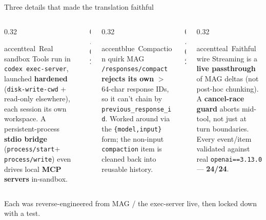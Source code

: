 \begin{frame}{Three details that made the translation faithful}
  \begin{columns}[t, totalwidth=\textwidth]
    \begin{column}{0.32\textwidth}
      \begin{featbox}{accentteal}{\ Real sandbox}
        \scriptsize
        Tools run in \texttt{codex exec-server}, launched \textbf{hardened}
        (\texttt{disk-write-cwd} + read-only elsewhere), each session its own
        workspace. A persistent-process \textbf{stdio bridge}
        (\texttt{process/start}$+$\texttt{process/write}) even drives local
        \textbf{MCP servers} in-sandbox.
      \end{featbox}
    \end{column}
    \begin{column}{0.02\textwidth}\end{column}
    \begin{column}{0.32\textwidth}
      \begin{featbox}{accentblue}{\ Compaction quirk}
        \scriptsize
        MAG \texttt{/responses/compact} \textbf{rejects its own} $>$64-char
        response IDs, so it can't chain by \texttt{previous\_response\_id}.
        Worked around via the \texttt{\{model,input\}} form; the non-input
        \texttt{compaction} item is cleaned back into reusable history.
      \end{featbox}
    \end{column}
    \begin{column}{0.02\textwidth}\end{column}
    \begin{column}{0.32\textwidth}
      \begin{featbox}{accentteal}{\ Faithful wire}
        \scriptsize
        Streaming is a \textbf{live passthrough} of MAG deltas (not post-hoc
        chunking). A \textbf{cancel-race guard} aborts mid-tool, not just at
        turn boundaries. Every event/item validated against real
        \texttt{openai==3.13.0} --- \textbf{24/24}.
      \end{featbox}
    \end{column}
  \end{columns}
  \vspace{8pt}
  \begin{center}
    {\footnotesize\color{midgray}Each was reverse-engineered from MAG / the
    exec-server live, then locked down with a test.}
  \end{center}
\end{frame}

